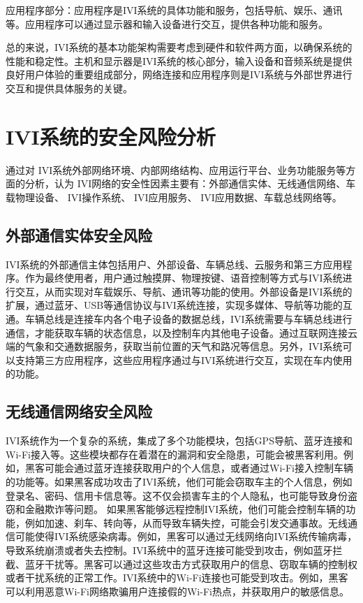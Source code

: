 应用程序部分：应用程序是IVI系统的具体功能和服务，包括导航、娱乐、通讯等。应用程序可以通过显示器和输入设备进行交互，提供各种功能和服务。

总的来说，IVI系统的基本功能架构需要考虑到硬件和软件两方面，以确保系统的性能和稳定性。主机和显示器是IVI系统的核心部分，输入设备和音频系统是提供良好用户体验的重要组成部分，网络连接和应用程序则是IVI系统与外部世界进行交互和提供具体服务的关键。
\section{IVI系统的安全风险分析}
通过对 IVI系统外部网络环境、内部网络结构、应用运行平台、业务功能服务等方面的分析，认为 IVI网络的安全性因素主要有：外部通信实体、无线通信网络、车载物理设备、 IVI操作系统、 IVI应用服务、 IVI应用数据、车载总线网络等。

\subsection{外部通信实体安全风险}

IVI系统的外部通信主体包括用户、外部设备、车辆总线、云服务和第三方应用程序。作为最终使用者，用户通过触摸屏、物理按键、语音控制等方式与IVI系统进行交互，从而实现对车载娱乐、导航、通讯等功能的使用。外部设备是IVI系统的扩展，通过蓝牙、USB等通信协议与IVI系统连接，实现多媒体、导航等功能的互通。车辆总线是连接车内各个电子设备的数据总线，IVI系统需要与车辆总线进行通信，才能获取车辆的状态信息，以及控制车内其他电子设备。通过互联网连接云端的气象和交通数据服务，获取当前位置的天气和路况等信息。另外，IVI系统可以支持第三方应用程序，这些应用程序通过与IVI系统进行交互，实现在车内使用的功能。

\subsection{无线通信网络安全风险}

IVI系统作为一个复杂的系统，集成了多个功能模块，包括GPS导航、蓝牙连接和Wi-Fi接入等。这些模块都存在着潜在的漏洞和安全隐患，可能会被黑客利用。例如，黑客可能会通过蓝牙连接获取用户的个人信息，或者通过Wi-Fi接入控制车辆的功能等。如果黑客成功攻击了IVI系统，他们可能会窃取车主的个人信息，例如登录名、密码、信用卡信息等。这不仅会损害车主的个人隐私，也可能导致身份盗窃和金融欺诈等问题。
如果黑客能够远程控制IVI系统，他们可能会控制车辆的功能，例如加速、刹车、转向等，从而导致车辆失控，可能会引发交通事故。无线通信可能使得IVI系统感染病毒。例如，黑客可以通过无线网络向IVI系统传输病毒，导致系统崩溃或者失去控制。IVI系统中的蓝牙连接可能受到攻击，例如蓝牙拦截、蓝牙干扰等。黑客可以通过这些攻击方式获取用户的信息、窃取车辆的控制权或者干扰系统的正常工作。IVI系统中的Wi-Fi连接也可能受到攻击。例如，黑客可以利用恶意Wi-Fi网络欺骗用户连接假的Wi-Fi热点，并获取用户的敏感信息。


